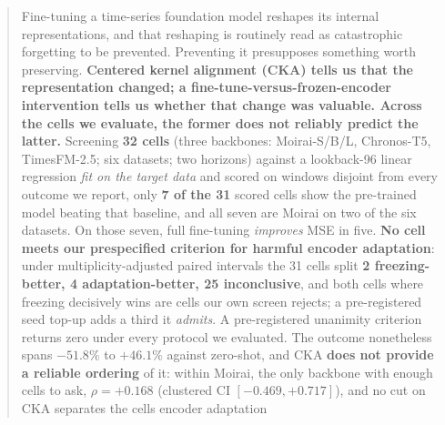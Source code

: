 \documentclass{article} %
\begin{document}
\begin{abstract}
Fine-tuning a time-series foundation model reshapes its internal
representations, and that reshaping is routinely read as catastrophic
forgetting to be prevented.  Preventing it presupposes something worth
preserving.  \textbf{Centered kernel alignment (CKA) tells us that the
representation changed; a
fine-tune-versus-frozen-encoder intervention tells us whether that change was
valuable.  Across the cells we evaluate, the former does not reliably predict
the latter.}
Screening \textbf{32 cells} (three backbones: Moirai-S/B/L, Chronos-T5,
TimesFM-2.5; six datasets; two horizons) against a lookback-96 linear
regression \emph{fit on the target data} and scored on windows disjoint from
every outcome we report, only \textbf{7 of the 31} scored cells show the
pre-trained model beating that baseline, and all seven are Moirai on two of the
six datasets.  On those seven, full fine-tuning \emph{improves} MSE in five.
\textbf{No cell meets our prespecified criterion for harmful encoder adaptation}: under
multiplicity-adjusted paired intervals the 31 cells split \textbf{2
freezing-better, 4 adaptation-better, 25 inconclusive}, and both cells
where freezing decisively wins are cells our own screen rejects; a
pre-registered seed top-up adds a third it \emph{admits}.  A
pre-registered unanimity criterion returns zero under every protocol we
evaluated.
The outcome nonetheless spans $-51.8\%$ to $+46.1\%$ against zero-shot, and CKA
\textbf{does not provide a reliable ordering} of it: within Moirai, the only
backbone with enough cells to ask, $\rho{=}{+}0.168$ (clustered CI
$[-0.469,{+}0.717]$), and no cut on CKA separates the cells encoder adaptation

\end{abstract}
\end{document}
